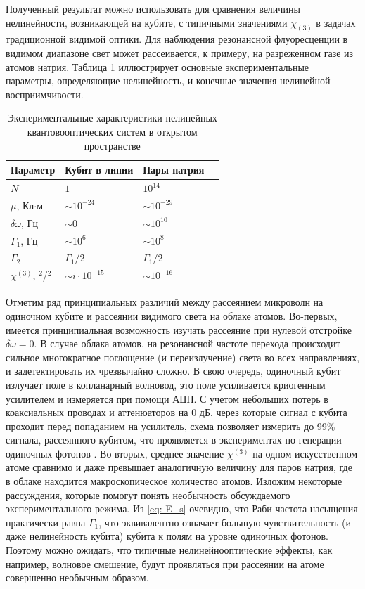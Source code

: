 Полученный результат можно использовать для сравнения величины нелинейности, возникающей на кубите, с типичными значениями $\chi_{(3)}$ в задачах традиционной видимой оптики. Для наблюдения резонансной флуоресценции в видимом диапазоне свет может рассеивается, к примеру, на разреженном газе из атомов натрия. Таблица \ref{Tab2} иллюстрирует основные экспериментальные параметры, определяющие нелинейность, и конечные значения нелинейной восприимчивости. 
\begin{table} [htbp]
	\centering
	\changecaptionwidth\captionwidth{15cm}
	\caption{Экспериментальные характеристики нелинейных квантовооптических систем в открытом пространстве}\label{Tab2}%
	\begin{tabular}{| p{2.4cm} | p{3.2cm} | p{3.2cm}l |}
		\hline
		\hline
		Параметр   & \centering Кубит в линии & \centering Пары натрия \cite{boyd2003nonlinear} & \\
		\hline
		$N$ &\centering  $1$  &\centering $10^{14}$ & \\
		$\mu$, Кл$\cdot$м &\centering  $\sim 10^{-24}$   &\centering  $\sim10^{-29}$ &\\
		$\delta\omega$, Гц &\centering  $\sim 0$  &\centering $\sim10^{10}$ &\\
		$\Gamma_1$, Гц &\centering  $\sim10^6$  &\centering $\sim10^8$ & \\
		$\Gamma_2$ &\centering  $\Gamma_1/2$  &\centering $\Gamma_1/2$ & \\
		$\chi^{(3)}$, \text{м}$^2$/\text{В}$^2$ &\centering $\sim i\cdot 10^{-15}$   &\centering  $\sim 10^{-16}$ & \\
		\hline
		\hline
	\end{tabular}
\end{table}

Отметим ряд принципиальных различий между рассеянием микроволн на одиночном кубите и рассеянии видимого света на облаке атомов. Во-первых, имеется принципиальная возможность изучать рассеяние при нулевой отстройке $\delta\omega\!=\!0$. В случае облака атомов, на резонансной частоте перехода происходит сильное многократное поглощение (и переизлучение) света во всех направлениях, и задетектировать их чрезвычайно сложно. В свою очередь, одиночный кубит излучает поле в копланарный волновод, это поле усиливается криогенным усилителем и измеряется при помощи АЦП. С учетом небольших потерь в коаксиальных проводах и аттенюаторов на 0 дБ, через которые сигнал с кубита проходит перед попаданием на усилитель, схема позволяет измерить до 99\% сигнала, рассеянного кубитом, что проявляется в экспериментах по генерации одиночных фотонов \cite{ZhouHighEfficiency}. Во-вторых, среднее значение $\chi^{(3)}$ на одном искусственном атоме сравнимо и даже превышает аналогичную величину для паров натрия, где в облаке находится макроскопическое количество атомов. Изложим некоторые рассуждения, которые помогут понять необычность обсуждаемого экспериментального режима. Из \eqref{eq: E_s} очевидно, что Раби частота насыщения практически равна $\Gamma_1$, что эквивалентно означает большую чувствительность (и даже нелинейность кубита) кубита к полям на уровне одиночных фотонов. Поэтому можно ожидать, что типичные нелинейнооптические эффекты, как например, волновое смешение, будут проявляться при рассеянии на атоме совершенно необычным образом.

